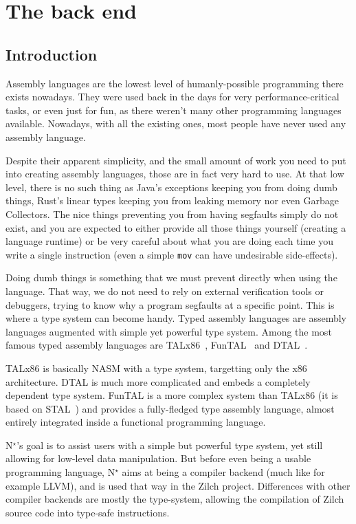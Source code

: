 \part{The back end}\label{part:nstar}


\chapter{Introduction}\label{chap:nstar-abstract}

Assembly languages are the lowest level of humanly-possible programming there exists nowadays. They were used back in the days for very performance-critical tasks, or even just for fun, as there weren't many other programming languages available. Nowadays, with all the existing ones, most people have never used any assembly language.

Despite their apparent simplicity, and the small amount of work you need to put into creating assembly languages, those are in fact very hard to use. At that low level, there is no such thing as Java's exceptions keeping you from doing dumb things, Rust's linear types keeping you from leaking memory nor even Garbage Collectors. The nice things preventing you from having segfaults simply do not exist, and you are expected to either provide all those things yourself (creating a language runtime) or be very careful about what you are doing each time you write a single instruction (even a simple \texttt{mov} can have undesirable side-effects).

Doing dumb things is something that we must prevent directly when using the language. That way, we do not need to rely on external verification tools or debuggers, trying to know why a program segfaults at a specific point.
This is where a type system can become handy. Typed assembly languages are assembly languages augmented with simple yet powerful type system. Among the most famous typed assembly languages are TALx86~\cite{TALx86}, FunTAL~\cite{FunTAL} and DTAL~\cite{DTAL}.

TALx86 is basically NASM with a type system, targetting only the x86 architecture. DTAL is much more complicated and embeds a completely dependent type system. FunTAL is a more complex system than TALx86 (it is based on STAL~\cite{STAL}) and provides a fully-fledged type assembly language, almost entirely integrated inside a functional programming language.

\vspace{\baselineskip}

N$^\star$'s goal is to assist users with a simple but powerful type system, yet still allowing for low-level data manipulation.
But before even being a usable programming language, N$^\star$ aims at being a compiler backend (much like for example LLVM), and is used that way in the Zilch project. Differences with other compiler backends are mostly the type-system, allowing the compilation of Zilch source code into type-safe instructions.

